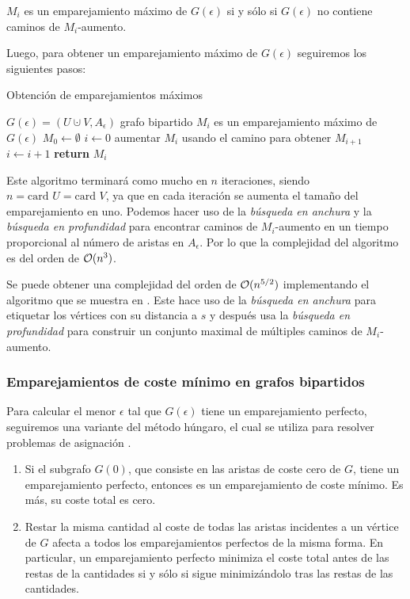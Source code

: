 \begin{lemma}
$M_i$ es un emparejamiento máximo de $G(\epsilon)$ si y sólo si $G(\epsilon)$ no contiene caminos de $M_i$-aumento.
\end{lemma}

Luego, para obtener un emparejamiento máximo de $G(\epsilon)$ seguiremos los siguientes pasos:

\begin{algorithm}[!ht]
\caption{Obtención de emparejamientos máximos}\label{ref:algEmpMax}
\begin{algorithmic}[1]
\Require $G(\epsilon)=(U \cupdot V, A_\epsilon)$ grafo bipartido
\Ensure $M_i$ es un emparejamiento máximo de $G(\epsilon)$
\State $M_0\gets \emptyset$
\State $i\gets 0$
	\State aumentar $M_i$ usando el camino para obtener $M_{i+1}$
	\State $i\gets i+1$
\EndWhile
\State \textbf{return} $M_i$
\end{algorithmic}
\end{algorithm}

Este algoritmo terminará como mucho en $n$ iteraciones, siendo $n= \text{card } U = \text{card } V$, ya que en cada iteración se aumenta el tamaño del emparejamiento en uno. Podemos hacer uso de la \emph{búsqueda en anchura} y la \emph{búsqueda en profundidad} para encontrar caminos de $M_i$-aumento en un tiempo proporcional al número de aristas en $A_\epsilon$. Por lo que la complejidad del algoritmo es del orden de $\mathcal{O}(n^3)$.

Se puede obtener una complejidad del orden de $\mathcal{O}(n^{5/2})$ implementando el algoritmo que se muestra en \cite{libroEH}. Este hace uso de la \emph{búsqueda en anchura} para etiquetar los vértices con su distancia a $s$ y después usa la \emph{búsqueda en profundidad} para construir un conjunto maximal de múltiples caminos de $M_i$-aumento.  

\subsubsection*{Emparejamientos de coste mínimo en grafos bipartidos}
Para calcular el menor $\epsilon$ tal que $G(\epsilon)$ tiene un emparejamiento perfecto, seguiremos una variante del método húngaro, el cual se utiliza para resolver problemas de asignación \cite{metodoHungaro}. 

\begin{property}
\leavevmode
\begin{enumerate}
	\item Si el subgrafo $G(0)$, que consiste en las aristas de coste cero de $G$, tiene un emparejamiento perfecto, entonces es un emparejamiento de coste mínimo. Es más, su coste total es cero.
	\item Restar la misma cantidad al coste de todas las aristas incidentes a un vértice de $G$ afecta a todos los emparejamientos perfectos de la misma forma. En particular, un emparejamiento perfecto minimiza el coste total antes de las restas de la cantidades si y sólo si sigue minimizándolo tras las restas de las cantidades.
\end{enumerate}
\end{property}

